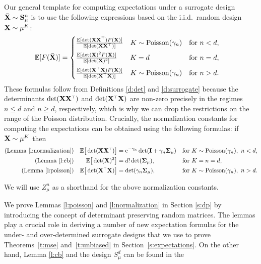 \documentclass[11pt]{article}
\begin{document}
 Our general template for computing expectations under
 a surrogate design ${\bar{\mathbf X}}\sim\mathbf{S}_\mu^n$ is to use the following expressions based on the
i.i.d.~random design $\mathbf X\sim\mu^K$:
\begin{align*}
  \E[F(\Xb)] &=\begin{cases}
    \frac{\E[\det(\X\X^\top)F(\X)]}{\E[\det(\X\X^\top)]}
   \quad K\sim\Poisson(\gamma_n)&\text{for }n<d,\\[2mm]
    \frac{\E[\det(\X)^2F(\X)]}{\E[\det(\X)^2]}\hspace{3mm}
    \quad K=d&\text{for }n=d,\\[2mm]
    \frac{\E[\det(\X^\top\X)F(\X)]}{\E[\det(\X^\top\X)]}
   \quad K\sim\Poisson(\gamma_n)&\text{for }n>d.    
  \end{cases}
\end{align*}
These formulas follow from Definitions \ref{d:det} and
\ref{d:surrogate} because the determinants $\det(\X\X^\top)$ and
$\det(\X^\top\X)$ are non-zero precisely in the regimes $n\leq d$ and
$n\geq d$, respectively, which is why we can drop the restrictions on the
range of the Poisson distribution.
Crucially, the normalization constants for computing the expectations
can be obtained using the following formulas: if $\mathbf X\sim\mu^K$ then 
\begin{align*}
\text{(Lemma~\ref{l:normalization})}&&
\E\big[\det(\X\X^\top)\big]  &= \ee^{-\gamma_n}\det(\I +
\gamma_n\Sigmab_\mu)&&\text{for } K\sim\Poisson(\gamma_n),\ n<d,\\
  \text{(Lemma~\ref{l:cb})}&& \E\big[\det(\X)^2\big] &=
  d!\det(\Sigmab_\mu),&&\text{for } K=n=d,\\
  \text{(Lemma~\ref{l:poisson})}&& \E\big[\det(\X^\top\X)\big]
&=\det(\gamma_n\Sigmab_\mu),&&  \text{for }K\sim\Poisson(\gamma_n),\ n>d.
\end{align*}
\begin{remark}
We will use $Z_\mu^n$ as a shorthand for the above normalization constants.
\end{remark}
We prove Lemmas \ref{l:poisson} and \ref{l:normalization} in Section
\ref{s:dp} by introducing the
concept of determinant preserving random matrices. The lemmas play a 
crucial role in deriving a number of new expectation formulas for the
under- and over-determined surrogate designs that we use to prove Theorems~\ref{t:mse}
and~\ref{t:unbiased} in Section~\ref{s:expectations}.
On the other hand, Lemma  \ref{l:cb} and the design $S_\mu^d$ can be found in the
\end{document}
